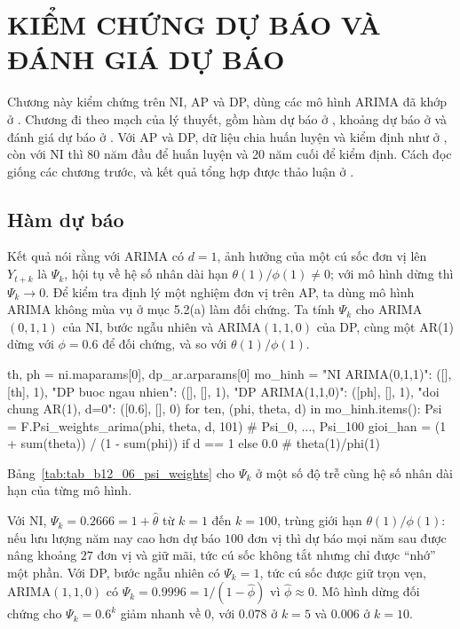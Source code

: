 \clearpage
\section[Kiểm chứng dự báo và đánh giá dự báo]{KIỂM CHỨNG DỰ BÁO VÀ ĐÁNH GIÁ DỰ BÁO}

Chương này kiểm chứng  trên NI, AP và DP, dùng các mô hình ARIMA đã khớp ở . Chương đi theo mạch của lý thuyết, gồm hàm dự báo ở , khoảng dự báo ở  và đánh giá dự báo ở . Với AP và DP, dữ liệu chia huấn luyện và kiểm định như ở , còn với NI thì 80 năm đầu để huấn luyện và 20 năm cuối để kiểm định. Cách đọc giống các chương trước, và kết quả tổng hợp được thảo luận ở .

\subsection{Hàm dự báo}

 Kết quả  nói rằng với ARIMA có $d=1$, ảnh hưởng của một cú sốc đơn vị lên $Y_{t+k}$ là $\Psi_k$, hội tụ về hệ số nhân dài hạn $\theta(1)/\phi(1)\ne0$; với mô hình dừng thì $\Psi_k\to0$.
 Để kiểm tra định lý một nghiệm đơn vị trên AP, ta dùng mô hình ARIMA không mùa vụ ở mục 5.2(a) làm đối chứng. Ta tính $\Psi_k$ cho ARIMA$(0,1,1)$ của NI, bước ngẫu nhiên và ARIMA$(1,1,0)$ của DP, cùng một AR(1) dừng với $\phi=0.6$ để đối chứng, và so với $\theta(1)/\phi(1)$.
\begin{codeblock}
th, ph = ni.maparams[0], dp_ar.arparams[0]
mo_hinh = {"NI ARIMA(0,1,1)": ([], [th], 1), "DP buoc ngau nhien": ([], [], 1),
           "DP ARIMA(1,1,0)": ([ph], [], 1), "doi chung AR(1), d=0": ([0.6], [], 0)}
for ten, (phi, theta, d) in mo_hinh.items():
    Psi = F.Psi_weights_arima(phi, theta, d, 101)             # Psi_0, ..., Psi_100
    gioi_han = (1 + sum(theta)) / (1 - sum(phi)) if d == 1 else 0.0   # theta(1)/phi(1)
\end{codeblock}
 Bảng~\ref{tab:tab_b12_06_psi_weights} cho $\Psi_k$ ở một số độ trễ cùng hệ số nhân dài hạn của từng mô hình.

 Với NI, $\Psi_k=0.2666=1+\hat\theta$ từ $k=1$ đến $k=100$, trùng giới hạn $\theta(1)/\phi(1)$: nếu lưu lượng năm nay cao hơn dự báo $100$ đơn vị thì dự báo mọi năm sau được nâng khoảng $27$ đơn vị và giữ mãi, tức cú sốc không tắt nhưng chỉ được ``nhớ'' một phần. Với DP, bước ngẫu nhiên có $\Psi_k=1$, tức cú sốc được giữ trọn vẹn, ARIMA$(1,1,0)$ có $\Psi_k=0.9996=1/(1-\hat\phi)$ vì $\hat\phi\approx0$. Mô hình dừng đối chứng cho $\Psi_k=0.6^k$ giảm nhanh về $0$, với $0.078$ ở $k=5$ và $0.006$ ở $k=10$.

